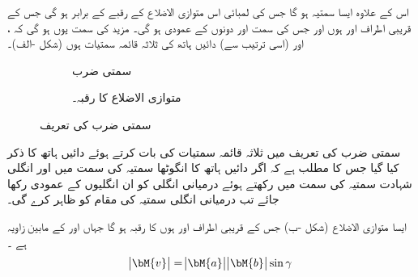 اس کے علاوہ  ایسا سمتیہ ہو گا جس کی لمبائی اس متوازی الاضلاع کے رقبے کے برابر ہو گی جس کے قریبی اطراف  اور  ہوں اور جس کی سمت  اور  دونوں کے عمودی ہو گی۔ مزید  کی سمت یوں ہو گی کہ ،  اور  (اسی ترتیب سے) دائیں ہاتھ کی ثلاثہ قائمہ سمتیات ہوں (شکل -الف)۔
 \begin{figure}
\centering
\begin{subfigure}{0.45\textwidth}
\centering
{}
\caption{ سمتی ضرب}
\end{subfigure} \hfill
\begin{subfigure}{0.45\textwidth}
\centering
{}
\caption{ متوازی الاضلاع کا رقبہ۔}
\end{subfigure}
\caption{سمتی ضرب کی تعریف}
\label{شکل_تعریف_الجبرا_سمتی_ضرب}
\end{figure}
 سمتی ضرب کی تعریف میں ثلاثہ قائمہ سمتیات کی بات کرتے ہوئے  دائیں ہاتھ کا ذکر کیا گیا جس کا مطلب ہے کہ  اگر دائیں ہاتھ کا انگوٹھا سمتیہ  کی سمت میں اور انگلی شہادت سمتیہ  کی سمت میں رکھتے ہوئے  درمیانی انگلی کو ان انگلیوں کے عمودی رکھا جائے تب درمیانی انگلی سمتیہ  کی مقام  کو ظاہر کرے گی۔ 

ایسا متوازی الاضلاع (شکل -ب) جس کے قریبی اطراف  اور  ہوں کا رقبہ
  ہو گا جہاں  اور  کے مابین زاویہ  ہے ۔
\begin{align}\label{مساوات_الجبرا_سمتی_ضرب_رقبہ}
\abs{\bM{v}}=\abs{\bM{a}}\abs{\bM{b}}\sin \gamma
\end{align}

